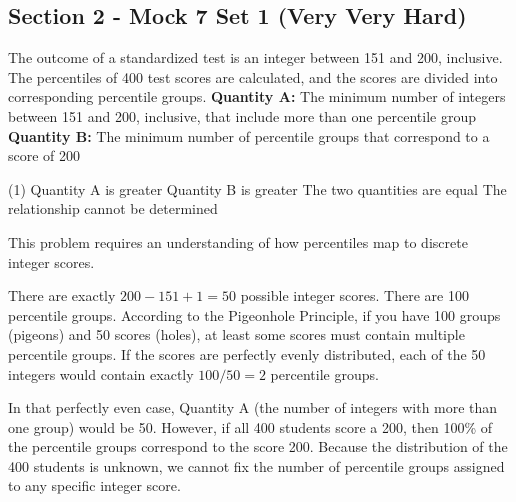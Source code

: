 \documentclass[11pt,paper=a4,answers]{exam}
\begin{document}
\begin{questions}
\pointsinrightmargin
\pointsdroppedatright
\marksnotpoints
{}
\pointformat{\boldmath\themarginpoints}
\bracketedpoints


\section*{Section 2 - Mock 7 Set 1 (Very Very Hard)}


\question
The outcome of a standardized test is an integer between 151 and 200, inclusive. The percentiles of 400 test scores are calculated, and the scores are divided into corresponding percentile groups.
\vspace{5pt}
\textbf{Quantity A: } The minimum number of integers between 151 and 200, inclusive, that include more than one percentile group \\
\vspace{5pt}
\textbf{Quantity B: } The minimum number of percentile groups that correspond to a score of 200

\begin{tasks}(1)
\task[A)] Quantity A is greater
\task[B)] Quantity B is greater
\task[C)] The two quantities are equal
\task[D)] The relationship cannot be determined
\end{tasks}

\begin{solution}
This problem requires an understanding of how percentiles map to discrete integer scores.
\vspace{5pt}
\begin{center}
There are exactly $200 - 151 + 1 = 50$ possible integer scores.
\vspace{5pt}
There are 100 percentile groups.
\vspace{5pt}
According to the Pigeonhole Principle, if you have 100 groups (pigeons) and 50 scores (holes), at least some scores must contain multiple percentile groups.
\vspace{5pt}
If the scores are perfectly evenly distributed, each of the 50 integers would contain exactly $100 / 50 = 2$ percentile groups.
\end{center}
\vspace{5pt}
In that perfectly even case, Quantity A (the number of integers with more than one group) would be 50.
\vspace{5pt}
However, if all 400 students score a 200, then 100\% of the percentile groups correspond to the score 200.
\vspace{5pt}
Because the distribution of the 400 students is unknown, we cannot fix the number of percentile groups assigned to any specific integer score.


\end{solution}
\end{questions}
\end{document}
